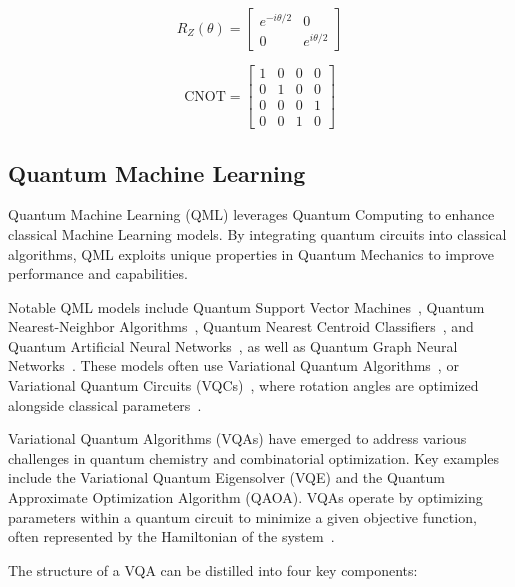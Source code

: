 \documentclass[12pt,a4paper]{report}
\begin{document}
\[
  R_Z(\theta) = \begin{bmatrix}
    e^{-i\theta/2} & 0             \\
    0              & e^{i\theta/2}
  \end{bmatrix}
\]

\[
  \text{CNOT} = \begin{bmatrix}
    1 & 0 & 0 & 0 \\
    0 & 1 & 0 & 0 \\
    0 & 0 & 0 & 1 \\
    0 & 0 & 1 & 0
  \end{bmatrix}
\]

\subsection{Quantum Machine Learning}
Quantum Machine Learning (QML) leverages Quantum Computing to enhance classical Machine Learning models. By integrating quantum circuits into classical algorithms, QML exploits unique properties in Quantum Mechanics to improve performance and capabilities.

Notable QML models include Quantum Support Vector Machines~\cite{rebentrost2014quantum}, Quantum Nearest-Neighbor Algorithms~\cite{wiebe2015quantum}, Quantum Nearest Centroid Classifiers~\cite{johri2021nearest}, and Quantum Artificial Neural Networks~\cite{narayanan2000quantum}, as well as Quantum Graph Neural Networks~\cite{hu2021forcenet}. These models often use Variational Quantum Algorithms~\cite{cerezo2021variational}, or Variational Quantum Circuits (VQCs)~\cite{benedetti2019parameterized}, where rotation angles are optimized alongside classical parameters~\cite{Comajoan_Cara_2024}.

Variational Quantum Algorithms (VQAs) have emerged to address various challenges in quantum chemistry and combinatorial optimization. Key examples include the Variational Quantum Eigensolver (VQE) and the Quantum Approximate Optimization Algorithm (QAOA). VQAs operate by optimizing parameters within a quantum circuit to minimize a given objective function, often represented by the Hamiltonian of the system~\cite{wang2024comprehensive}.

The structure of a VQA can be distilled into four key components:
\end{document}
